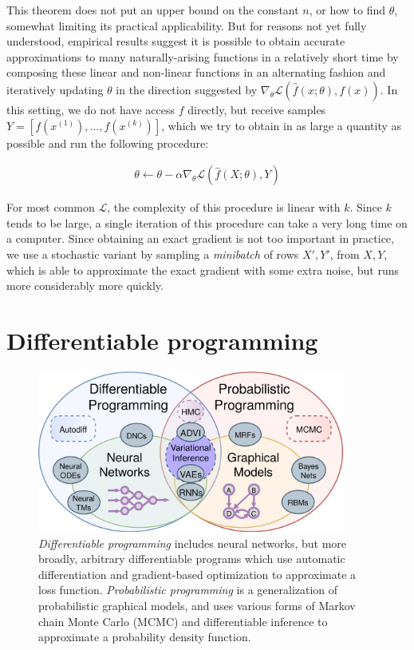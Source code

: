\documentclass[12pt,initial,twoside,maitrise]{dms}
\numberwithin{equation}{section}
\numberwithin{table}{chapter}
\numberwithin{figure}{chapter}
\begin{document}
    This theorem does not put an upper bound on the constant $n$, or how to find $\theta$, somewhat limiting its practical applicability. But for reasons not yet fully understood, empirical results suggest it is possible to obtain accurate approximations to many naturally-arising functions in a relatively short time by composing these linear and non-linear functions in an alternating fashion and iteratively updating $\theta$ in the direction suggested by $\nabla_{\theta} \mathcal{L}(\hat{f}(x;\theta), f(x))$. In this setting, we do not have access $f$ directly, but receive samples $Y = [f(x^{(1)}), \dots, f(x^{(k)})]$, which we try to obtain in as large a quantity as possible and run the following procedure:

\begin{equation}\label{eq:grad_descent}
    \begin{split}
        \theta \leftarrow \theta - \alpha\nabla_\theta\mathcal{L}(\hat{f}(X;\theta), Y)
    \end{split}
\end{equation}

For most common $\mathcal{L}$, the complexity of this procedure is linear with $k$. Since $k$ tends to be large, a single iteration of this procedure can take a very long time on a computer. Since obtaining an exact gradient is not too important in practice, we use a stochastic variant by sampling a \textit{minibatch} of rows $X', Y'$, from $X, Y$, which is able to approximate the exact gradient with some extra noise, but runs more considerably more quickly.

\section{Differentiable programming}\label{sec:differentiable-programming}

\begin{figure}
    \centering
    \includegraphics[width=0.90\textwidth]{diff_prob_prog.png}
    \caption{\textit{Differentiable programming} includes neural networks, but more broadly, arbitrary differentiable programs which use automatic differentiation and gradient-based optimization to approximate a loss function. \textit{Probabilistic programming} is a generalization of probabilistic graphical models, and uses various forms of Markov chain Monte Carlo (MCMC) and differentiable inference to approximate a probability density function.}
    \label{fig:diff_prob_prog}
\end{figure}
\end{document}
